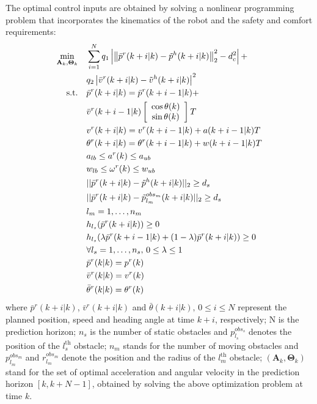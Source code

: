 \documentclass[letterpaper, 10 pt, conference]{ieeeconf}
\begin{document}
	The optimal control inputs are obtained by solving a nonlinear programming problem that incorporates the kinematics of the robot and the safety and comfort requirements:
	\begin{subequations}\label{eqn:path_plan_mpc}
		\begin{align}
			\min_{\mathbf{A}_k,\mathbf{\Theta}_k} \quad &\sum\limits_{i=1}^{N} q_1\left| \left\|\bar{p}^r(k+i|k)-\tilde{p}^h(k+i|k)\right\|^2_2-d^2_{c}\right| + \notag\\
			& q_2\left|\bar{v}^r(k+i|k)-\tilde{v}^h(k+i|k)\right|^2\label{eqn:obj}\\
			\text{s.t.} \quad & \bar{p}^r(k+i|k)=\bar{p}^r(k+i-1|k)+\notag\\
			&\bar{v}^r(k+i-1|k)
			\left[ 
			\begin{array}{c}
				\cos \theta(k)\\
				\sin \theta(k)\\
			\end{array}
			\right]T\label{eqn:constr:dyn_pre_motion}\\
			& v^r(k+i|k)=v^r(k+i-1|k)+a(k+i-1|k)T\label{eqn:constr:dyn_pre_v}\\       &\theta^r(k+i|k)=\theta^r(k+i-1|k)+w(k+i-1|k)T\label{eqn:constr:dyn_pre_theta}\\
			& a_{lb}\le a^r(k)\le a_{ub}\label{eqn:constr:a}\\
			& w_{lb}\le \omega^r(k)\le w_{ub}\label{eqn:constr:w}\\
			& ||\bar{p}^r(k+i|k)-\tilde{p}^h(k+i|k)||_2\geq d_s\label{eqn:constr:safety}\\
			& ||\bar{p}^r(k+i|k)-\tilde{p}^{obs_m}_{l_m}(k+i|k)||_2\geq d_s\label{eqn:constr:safety_mv_obs}\\
			& l_m=1,\dots,n_m\notag\\
			& h_{l_s}(\bar{p}^r(k+i|k))\ge 0\label{eqn:constr:safety_s_obs1}\\
			& h_{l_s}(\lambda \bar{p}^r(k+i-1|k)+(1-\lambda)\bar{p}^r(k+i|k))\ge 0\label{eqn:constr:safety_s_obs2}\\
			& \forall l_s=1,\dots,n_s,\, 0\le \lambda\le 1\notag\\
			& \bar{p}^r(k|k)=p^r(k)\label{eqn:constr:init_z}\\
			& \bar{v}^r(k|k)=v^r(k)\label{eqn:constr:init_v}\\
			& \bar{\theta}^r(k|k)=\theta^r(k)\label{eqn:constr:init_theta}
		\end{align}
	\end{subequations}
	where $\bar{p}^r(k+i|k)$, $\bar{v}^r(k+i|k)$ and $\bar{\theta}(k+i|k),\, 0\le i\le N$ represent the planned position, speed and heading angle at time $k+i$, respectively;
	N is the prediction horizon;
	$n_s$ is the number of static obstacles and $p^{obs_s}_{l_s}$ denotes the position of the $l_s^{\text{th}}$ obstacle;
	$n_m$ stands for the number of moving obstacles and $p^{obs_m}_{l_m}$ and $r^{obs_m}_{l_m}$ denote the position and the radius of the $l_m^{\text{th}}$ obstacle;
	$(\mathbf{A}_k,\mathbf{\Theta}_k)$ stand for the set of optimal acceleration and angular velocity in the prediction  horizon $[k,k+N-1]$, obtained by solving the above optimization problem at time $k$.
	
\end{document}
